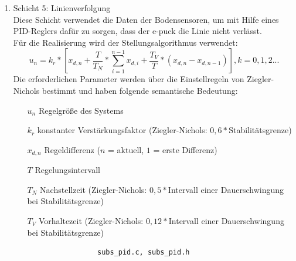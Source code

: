 \documentclass[10pt,a4paper]{article}
\begin{document}
\begin{enumerate}
  				\item Schicht 5: Linienverfolgung \\
					Diese Schicht verwendet die Daten der Bodensensoren, um mit Hilfe eines PID-Reglers dafür zu sorgen, dass der e-puck die Linie
					nicht verlässt. \\
					Für die Realisierung wird der Stellungsalgorithmus verwendet:
					\begin{equation}
						u_n = k_r * \left[ x_{d,n} + \frac{T}{T_N} * \sum_{i=1}^{n-1}x_{d,i} + \frac{T_V}{T}*(x_{d,n}-x_{d,n-1}) \right], k=0,1,2...
					\end{equation}
					Die erforderlichen Parameter werden über die Einstellregeln von Ziegler-Nichols bestimmt und haben folgende semantische Bedeutung:
					\begin{itemize}
						\item[$u_n$] Regelgröße des Systems
						\item[$k_r$] konstanter Verstärkungsfaktor (Ziegler-Nichols: $0,6 * $Stabilitätsgrenze)
						\item[$x_{d,n}$] Regeldifferenz ($n$ = aktuell, $1$ = erste Differenz)
						\item[$T$] Regelungsintervall
						\item[$T_N$] Nachstellzeit (Ziegler-Nichols: $0,5 * $Intervall einer Dauerschwingung bei Stabilitätsgrenze)
						\item[$T_V$] Vorhaltezeit (Ziegler-Nichols: $0,12 * $Intervall einer Dauerschwingung bei Stabilitätsgrenze)
					\end{itemize}

					\begin{verbatim}
					subs_pid.c, subs_pid.h
					\end{verbatim}

  			\end{enumerate}
\end{document}
